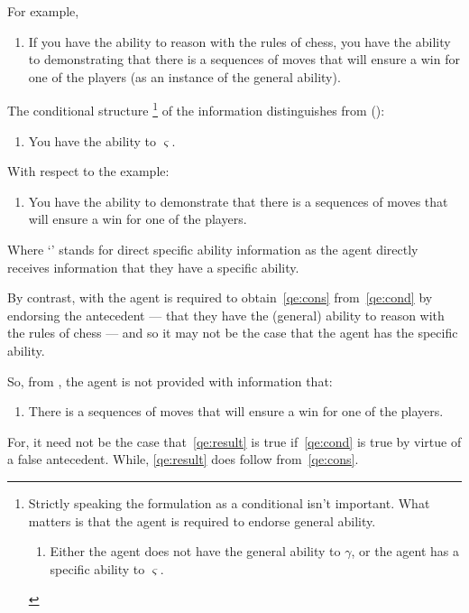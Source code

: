 \begin{note}
  For example,
  \begin{enumerate}[label=(\GSI{}\arabic*), ref=(\GSI{}\arabic*)]
  \item\label{qe:cond} If you have the ability to reason with the rules of chess, you have the ability to demonstrating that there is a sequences of moves that will ensure a win for one of the players (as an instance of the general ability).
  \end{enumerate}
  The conditional structure\nolinebreak
  \footnote{
    Strictly speaking the formulation as a conditional isn't important.
    What matters is that the agent is required to endorse general ability.
    \begin{enumerate}[label=(\GSI{}\('\)), ref=(\GSI{}\('\))]
    \item Either the agent does not have the general ability to \(\gamma\), or the agent has a specific ability to \(\varsigma\).
    \end{enumerate}
  }
  of the information distinguishes \GSI{} from (\dSI{}):
  \begin{enumerate}[label=(\dSI{}), ref=(\dSI{})]
  \item You have the ability to \(\varsigma\).
  \end{enumerate}
  With respect to the example:
  \begin{enumerate}[label=(\dSI{}\arabic*), ref=(\dSI{}\arabic*)]
  \item\label{qe:cons} You have the ability to demonstrate that there is a sequences of moves that will ensure a win for one of the players.
  \end{enumerate}
  Where `\dSI{}' stands for direct specific ability information as the agent directly receives information that they have a specific ability.

  By contrast, with \GSI{} the agent is required to obtain~\ref{qe:cons} from~\ref{qe:cond} by endorsing the antecedent --- that they have the (general) ability to reason with the rules of chess --- and so it may not be the case that the agent has the specific ability.

  So, from \GSI{}, the agent is not provided with information that:
  \begin{enumerate}[label=(I\arabic*), ref=(I\arabic*), resume]
  \item\label{qe:result} There is a sequences of moves that will ensure a win for one of the players.
  \end{enumerate}
  For, it need not be the case that~\ref{qe:result} is true if~\ref{qe:cond} is true by virtue of a false antecedent.
  While, \ref{qe:result} does follow from~\ref{qe:cons}.


\end{note}
